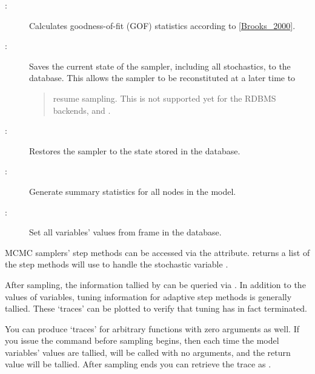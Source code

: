 \documentclass[letterpaper,10pt,english]{sphinxmanual}
\begin{document}
\begin{description}
\item[{:}] \leavevmode
Calculates goodness-of-fit (GOF) statistics according to {\hyperref[references:brooks-2000]{{[}Brooks\_2000{]}}}.

\item[{:}] \leavevmode
Saves the current state of the sampler, including all stochastics, to the
database. This allows the sampler to be reconstituted at a later time to
\begin{quote}

resume sampling. This is not supported yet for the RDBMS backends,
 and .
\end{quote}

\item[{:}] \leavevmode
Restores the sampler to the state stored in the database.

\item[{:}] \leavevmode
Generate summary statistics for all nodes in the model.

\item[{:}] \leavevmode
Set all variables' values from frame  in the database.

\end{description}

MCMC samplers' step methods can be accessed via the 
attribute.  returns a list of the step methods 
will use to handle the stochastic variable .

After sampling, the information tallied by  can be queried via . In addition to the values of variables, tuning information for adaptive step methods is generally tallied. These ‘traces’ can be plotted to verify that tuning has in fact terminated.

You can produce `traces' for arbitrary functions with zero arguments as well. If you issue the command  before sampling begins, then each time the model variables’ values are tallied,  will be called with no arguments, and the return value will be tallied. After sampling ends you can retrieve the trace as .
\end{document}
